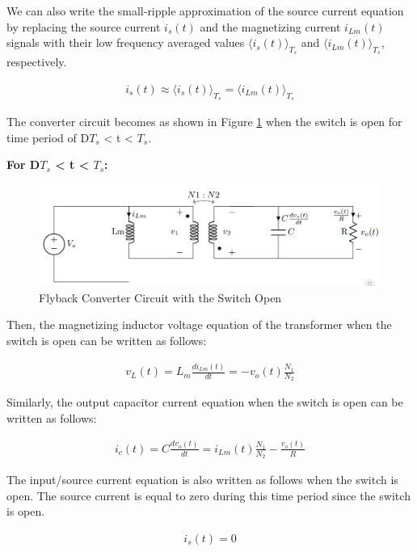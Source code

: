 We can also write the small-ripple approximation of the source current equation by replacing the source current $i_s(t)$ and the magnetizing current $i_{Lm}(t)$ signals with their low frequency averaged values $\langle i_s(t) \rangle_{T_s}$ and $\langle i_{Lm}(t) \rangle_{T_s}$, respectively.

\begin{align}
    i_s(t) \approx \langle i_s(t) \rangle_{T_s} = \langle i_{Lm}(t) \rangle_{T_s}
\end{align}

The converter circuit becomes as shown in Figure \ref{com:fly_off} when the switch is open for time period of D$T_s$ < t < $T_s$.

\textbf{For D$T_s$ < t < $T_s$:}

\begin{figure}[H]
\begin{center}
\includegraphics[width=1\textwidth]{Compensator/flyback_off.png}
\caption{Flyback Converter Circuit with the Switch Open}
\label{com:fly_off}
\end{center}
\end{figure}

Then, the magnetizing inductor voltage equation of the transformer when the switch is open can be written as follows:

\begin{align}
    v_L(t) = L_m\frac{di_{Lm}(t)}{dt} = -v_o(t)\frac{N_1}{N_2}
\end{align}

Similarly, the output capacitor current equation when the switch is open can be written as follows:

\begin{align}
    i_c(t) = C\frac{dv_o(t)}{dt} = i_{Lm}(t)\frac{N_1}{N_2} -\frac{v_o(t)}{R}
\end{align}

The input/source current equation is also written as follows when the switch is open. The source current is equal to zero during this time period since the switch is open.

\begin{align}
    i_s(t) = 0
\end{align}

